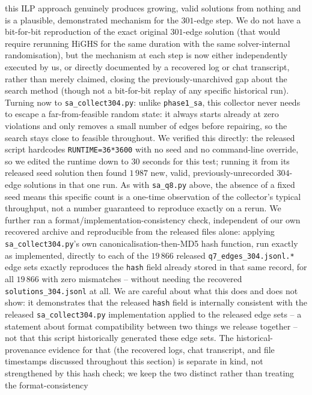 \documentclass[12pt]{article}
\begin{document}
this ILP approach genuinely produces growing, valid solutions from
nothing and is a plausible, demonstrated mechanism for the $301$-edge
step. We do not have a bit-for-bit reproduction of the exact original
$301$-edge solution (that would require rerunning HiGHS for the same
duration with the same solver-internal randomisation), but the
mechanism at each step is now either independently executed by us, or directly documented by a
recovered log or chat transcript, rather than merely claimed, closing the previously-unarchived
gap about the search method (though not a bit-for-bit
replay of any specific historical run). Turning now to
\texttt{sa\_collect304.py}: unlike
\texttt{phase1\_sa}, this collector never needs to escape a
far-from-feasible random state: it always starts already at zero
violations and only removes a small number of edges before repairing,
so the search stays close to feasible throughout. We verified this
directly: the released script hardcodes \texttt{RUNTIME=36*3600} with
no seed and no command-line override, so we edited the runtime down
to $30$ seconds for this test; running it from its
released seed solution then found $1\,987$ new, valid,
previously-unrecorded $304$-edge solutions in that one run. As with
\texttt{sa\_q8.py} above, the absence of a fixed seed means this
specific count is a one-time observation of the collector's typical
throughput, not a number guaranteed to reproduce exactly on a rerun.
We further ran a
format/implementation-consistency check, independent of our own
recovered archive and
reproducible from the released files alone: applying
\texttt{sa\_collect304.py}'s own canonicalisation-then-MD5 hash
function, run exactly as implemented, directly
to each of the $19\,866$ released
\texttt{q7\_edges\_304.jsonl.*} edge sets exactly reproduces the
\texttt{hash} field already stored in that same record, for all
$19\,866$ with zero mismatches -- without needing the recovered
\texttt{solutions\_304.jsonl} at all. We are careful about what this
does and does not show: it demonstrates that the released
\texttt{hash} field is internally consistent with the released
\texttt{sa\_collect304.py} implementation applied to the released edge
sets -- a statement about format compatibility between two things we
release together -- not that this script historically generated these
edge sets. The historical-provenance evidence for that (the recovered
logs, chat transcript, and file timestamps discussed throughout this
section) is separate in kind, not strengthened by this hash check;
we keep the two distinct rather than treating the format-consistency
\end{document}
